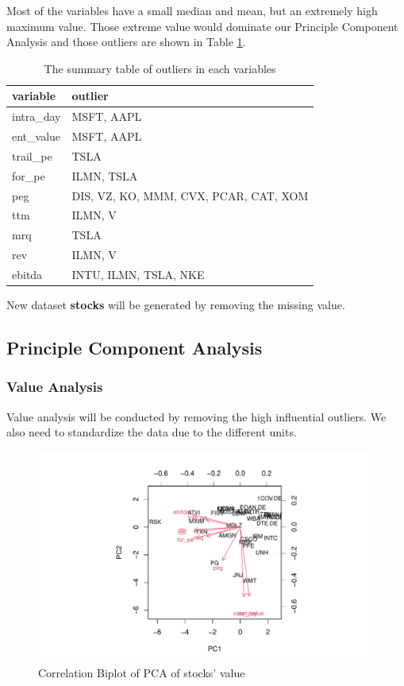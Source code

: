 \documentclass[11pt,a4paper,]{article}
\begin{document}
Most of the variables have a small median and mean, but an extremely high maximum value. Those extreme value would dominate our Principle Component Analysis and those outliers are shown in Table \ref{tab:outliers-table}.

\begin{table}

\caption{\label{tab:outliers-table}The summary table of outliers in each variables}
\centering
\begin{tabular}[t]{l|l}
\hline
variable & outlier\\
\hline
intra\_day & MSFT, AAPL\\
\hline
ent\_value & MSFT, AAPL\\
\hline
trail\_pe & TSLA\\
\hline
for\_pe & ILMN, TSLA\\
\hline
peg & DIS, VZ, KO, MMM, CVX, PCAR, CAT, XOM\\
\hline
ttm & ILMN, V\\
\hline
mrq & TSLA\\
\hline
rev & ILMN, V\\
\hline
ebitda & INTU, ILMN, TSLA, NKE\\
\hline
\end{tabular}
\end{table}

New dataset \textbf{stocks} will be generated by removing the missing value.

\hypertarget{principle-component-analysis}{%
\subsection{Principle Component Analysis}\label{principle-component-analysis}}

\hypertarget{value-analysis}{%
\subsubsection{Value Analysis}\label{value-analysis}}

Value analysis will be conducted by removing the high influential outliers. We also need to standardize the data due to the different units.

\begin{figure}
\centering
\includegraphics{ass2_files/figure-latex/pca-cor-1.pdf}
\caption{\label{fig:pca-cor}Correlation Biplot of PCA of stocks' value}
\end{figure}
\end{document}
